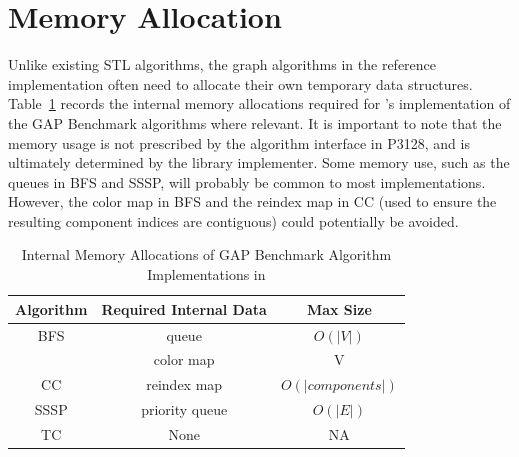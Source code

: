 \section{Memory Allocation}

Unlike existing STL algorithms, the graph algorithms in the \stdgraph reference
implementation often need to allocate their own temporary data structures.
Table~\ref{tab:internalmem} records the internal memory allocations
required for \stdgraph's implementation of the GAP Benchmark algorithms
where relevant.
It is important to note that the memory usage is not prescribed
by the algorithm interface in P3128, and is ultimately determined by the
library implementer.
Some memory use, such as the queues in BFS and SSSP, will
probably be common to most implementations.
However, the color map in BFS and the reindex map in CC
(used to ensure the resulting component indices are contiguous)
could potentially be avoided.

\begin{table}[h!]
\centering
\begin{tabular}{| c | c | c |}
\hline
Algorithm & Required Internal Data & Max Size \\\hline
BFS       & queue          & $O(|V|)$ \\
          & color map      & V \\\hline
CC        & reindex map    & $O(|components|)$ \\\hline
SSSP      & priority queue & $O(|E|)$\\\hline
TC        & None           & N\/A\\
\hline
\end{tabular}
\caption{Internal Memory Allocations of GAP Benchmark Algorithm Implementations in \stdgraph}
\label{tab:internalmem}
\end{table}
